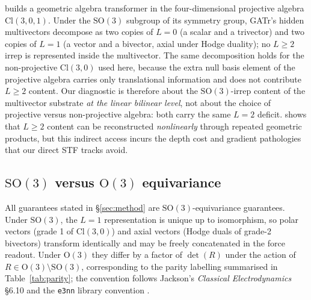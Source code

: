\citet{brehmer2023geometric} builds a geometric algebra transformer in the four-dimensional projective algebra $\mathrm{Cl}(3,0,1)$. Under the $\mathrm{SO}(3)$ subgroup of its symmetry group, GATr's hidden multivectors decompose as two copies of $L{=}0$ (a scalar and a trivector) and two copies of $L{=}1$ (a vector and a bivector, axial under Hodge duality); no $L \geq 2$ irrep is represented inside the multivector. The same decomposition holds for the non-projective $\mathrm{Cl}(3,0)$ used here, because the extra null basis element of the projective algebra carries only translational information and does not contribute $L \geq 2$ content. Our diagnostic is therefore about the $\mathrm{SO}(3)$-irrep content of the multivector substrate \emph{at the linear bilinear level}, not about the choice of projective versus non-projective algebra: both carry the same $L{=}2$ deficit. \citet{ruhe2023cgenn} shows that $L \geq 2$ content can be reconstructed \emph{nonlinearly} through repeated geometric products, but this indirect access incurs the depth cost and gradient pathologies that our direct STF tracks avoid.


\subsection{\texorpdfstring{$\mathrm{SO}(3)$}{SO(3)} versus \texorpdfstring{$\mathrm{O}(3)$}{O(3)} equivariance}\label{supp:so3_o3}

All guarantees stated in \S\ref{sec:method} are $\mathrm{SO}(3)$-equivariance guarantees. Under $\mathrm{SO}(3)$, the $L{=}1$ representation is unique up to isomorphism, so polar vectors (grade 1 of $\mathrm{Cl}(3,0)$) and axial vectors (Hodge duals of grade-2 bivectors) transform identically and may be freely concatenated in the force readout. Under $\mathrm{O}(3)$ they differ by a factor of $\det(R)$ under the action of $R \in \mathrm{O}(3)\setminus\mathrm{SO}(3)$, corresponding to the parity labelling summarised in Table~\ref{tab:parity}; the convention follows Jackson's \emph{Classical Electrodynamics} \S6.10 and the \texttt{e3nn} library convention \citep{geiger2022e3nn}.


